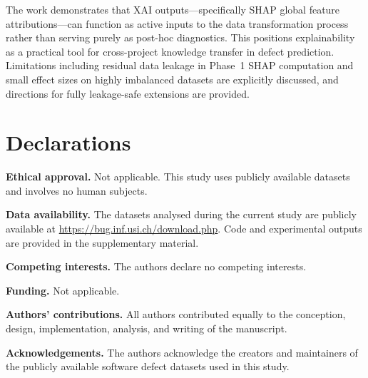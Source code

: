 \documentclass[12pt, a4paper]{article}
\begin{document}
The work demonstrates that XAI outputs---specifically SHAP global feature
attributions---can function as active inputs to the data transformation process
rather than serving purely as post-hoc diagnostics. This positions
explainability as a practical tool for cross-project knowledge transfer in
defect prediction. Limitations including residual data leakage in Phase~1
SHAP computation and small effect sizes on highly imbalanced datasets are
explicitly discussed, and directions for fully leakage-safe extensions are
provided.

\section*{Declarations}

\noindent\textbf{Ethical approval.}
Not applicable. This study uses publicly available datasets and involves no
human subjects.

\noindent\textbf{Data availability.}
The datasets analysed during the current study are publicly available at
\url{https://bug.inf.usi.ch/download.php}. Code and experimental outputs are
provided in the supplementary material.

\noindent\textbf{Competing interests.}
The authors declare no competing interests.

\noindent\textbf{Funding.}
Not applicable.

\noindent\textbf{Authors' contributions.}
All authors contributed equally to the conception, design, implementation,
analysis, and writing of the manuscript.

\noindent\textbf{Acknowledgements.}
The authors acknowledge the creators and maintainers of the publicly available
software defect datasets used in this study.




%
%
\end{document}
